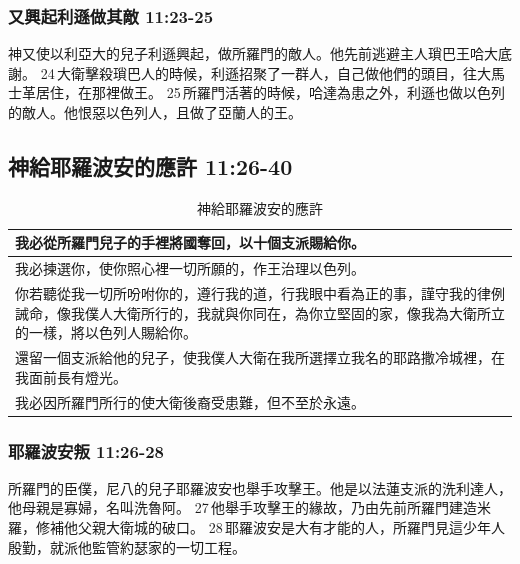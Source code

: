 \subsubsection{又興起利遜做其敵 11:23-25}
神又使以利亞大的兒子利遜興起，做所羅門的敵人。他先前逃避主人瑣巴王哈大底謝。 24 大衛擊殺瑣巴人的時候，利遜招聚了一群人，自己做他們的頭目，往大馬士革居住，在那裡做王。 25 所羅門活著的時候，哈達為患之外，利遜也做以色列的敵人。他恨惡以色列人，且做了亞蘭人的王。

\subsection{神給耶羅波安的應許 11:26-40 }
\begin{table}[!hbp]
\centering 
\begin{tabular}{|p{13cm}|}\hline\hline
我必從所羅門兒子的手裡將國奪回，以十個支派賜給你。\\\hline
我必揀選你，使你照心裡一切所願的，作王治理以色列。\\\hline
你若聽從我一切所吩咐你的，遵行我的道，行我眼中看為正的事，謹守我的律例誡命，像我僕人大衛所行的，我就與你同在，為你立堅固的家，像我為大衛所立的一樣，將以色列人賜給你。\\\hline
還留一個支派給他的兒子，使我僕人大衛在我所選擇立我名的耶路撒冷城裡，在我面前長有燈光。\\\hline
我必因所羅門所行的使大衛後裔受患難，但不至於永遠。\\\hline
\end{tabular}
\caption{神給耶羅波安的應許}
\end{table}

\subsubsection{耶羅波安叛 11:26-28}
所羅門的臣僕，尼八的兒子耶羅波安也舉手攻擊王。他是以法蓮支派的洗利達人，他母親是寡婦，名叫洗魯阿。 27 他舉手攻擊王的緣故，乃由先前所羅門建造米羅，修補他父親大衛城的破口。 28 耶羅波安是大有才能的人，所羅門見這少年人殷勤，就派他監管約瑟家的一切工程。

